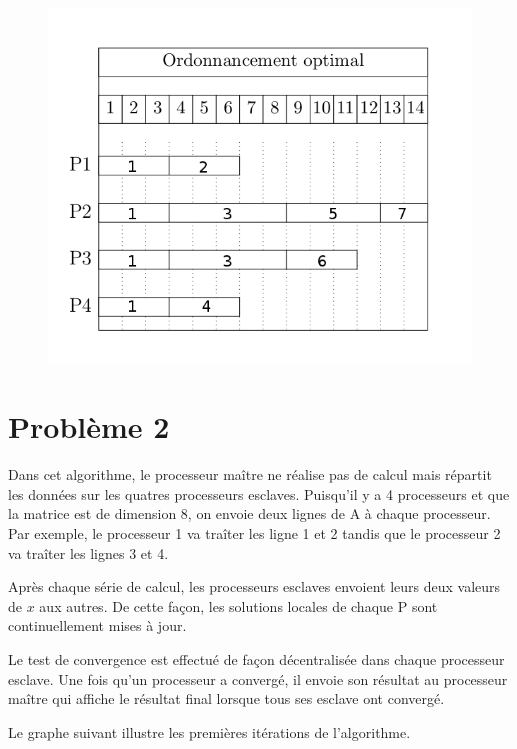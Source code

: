 \documentclass[12pt]{article}
\begin{document}
\begin{figure}[H]
  \includegraphics[width=14cm]{gantt.png}
\end{figure}

\newpage

\section{Problème 2}



Dans cet algorithme, le processeur maître ne réalise pas de calcul
mais répartit les données sur les quatres processeurs
esclaves. Puisqu'il y a 4 processeurs et que la matrice est de
dimension 8, on envoie deux lignes de A à chaque processeur. Par
exemple, le processeur 1 va traîter les ligne 1 et 2 tandis que le
processeur 2 va traîter les lignes 3 et 4.

Après chaque série de calcul, les processeurs esclaves envoient leurs
deux valeurs de $x$ aux autres. De cette façon, les solutions locales
de chaque P sont continuellement mises à jour.

Le test de convergence est effectué de façon décentralisée dans chaque
processeur esclave. Une fois qu'un processeur a convergé, il envoie
son résultat au processeur maître qui affiche le résultat final
lorsque tous ses esclave ont convergé.

Le graphe suivant illustre les premières itérations de l'algorithme.
\end{document}
